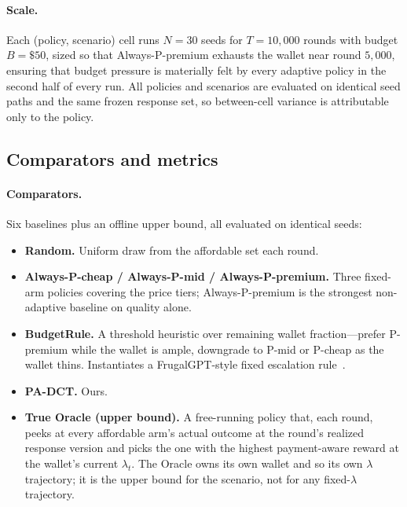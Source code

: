\paragraph{Scale.}
Each (policy, scenario) cell runs $N = 30$ seeds for $T = 10{,}000$ rounds with budget $B = \$50$, sized so that Always-P-premium exhausts the wallet near round $5{,}000$, ensuring that budget pressure is materially felt by every adaptive policy in the second half of every run. All policies and scenarios are evaluated on identical seed paths and the same frozen response set, so between-cell variance is attributable only to the policy.

\subsection{Comparators and metrics}
\label{sec:eval-comparators}

\paragraph{Comparators.}
Six baselines plus an offline upper bound, all evaluated on identical seeds:
\begin{itemize}
\item \textbf{Random.} Uniform draw from the affordable set each round.
\item \textbf{Always-P-cheap / Always-P-mid / Always-P-premium.} Three fixed-arm policies covering the price tiers; Always-P-premium is the strongest non-adaptive baseline on quality alone.
\item \textbf{BudgetRule.} A threshold heuristic over remaining wallet fraction—prefer P-premium while the wallet is ample, downgrade to P-mid or P-cheap as the wallet thins. Instantiates a FrugalGPT-style fixed escalation rule~\citep{chen2023frugalgpt}.
\item \textbf{PA-DCT.} Ours.
\item \textbf{True Oracle (upper bound).} A free-running policy that, each round, peeks at every affordable arm's actual outcome at the round's realized response version and picks the one with the highest payment-aware reward at the wallet's current $\lambda_t$. The Oracle owns its own wallet and so its own $\lambda$ trajectory; it is the upper bound for the scenario, not for any fixed-$\lambda$ trajectory.
\end{itemize}

